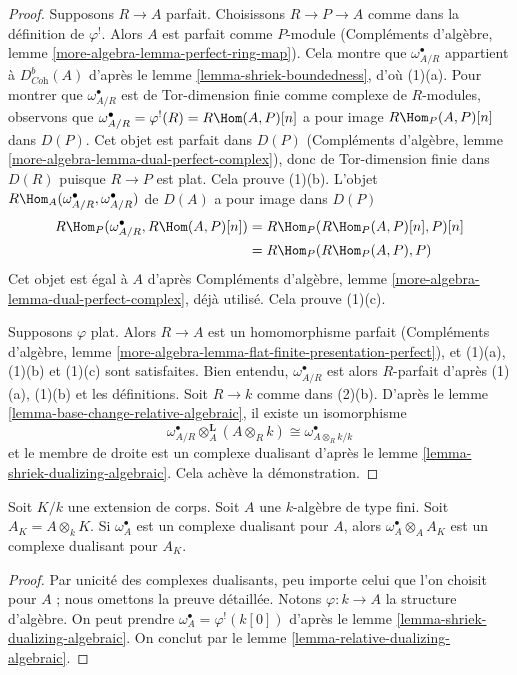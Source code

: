 \begin{proof}
Supposons $R \to A$ parfait. Choisissons $R \to P \to A$ comme dans la définition de $\varphi^!$.
Alors $A$ est parfait comme $P$-module
(Compléments d'algèbre, lemme \ref{more-algebra-lemma-perfect-ring-map}).
Cela montre que $\omega_{A/R}^\bullet$ appartient à $D^b_{\textit{Coh}}(A)$ d'après le lemme \ref{lemma-shriek-boundedness}, d'où (1)(a).
Pour montrer que $\omega_{A/R}^\bullet$ est de Tor-dimension finie comme complexe de $R$-modules,
observons que $\omega_{A/R}^\bullet = \varphi^!(R) = R\Hom(A, P)[n]$ a pour image $R\Hom_P(A, P)[n]$ dans $D(P)$.
Cet objet est parfait dans $D(P)$ (Compléments d'algèbre, lemme \ref{more-algebra-lemma-dual-perfect-complex}),
donc de Tor-dimension finie dans $D(R)$ puisque $R \to P$ est plat.
Cela prouve (1)(b). L'objet $R\Hom_A(\omega_{A/R}^\bullet, \omega_{A/R}^\bullet)$ de $D(A)$ a pour image dans $D(P)$
\begin{align*}
R\Hom_P(\omega_{A/R}^\bullet, R\Hom(A, P)[n])
& =
R\Hom_P(R\Hom_P(A, P)[n], P)[n] \\
& =
R\Hom_P(R\Hom_P(A, P), P)
\end{align*}
Cet objet est égal à $A$ d'après Compléments d'algèbre, lemme \ref{more-algebra-lemma-dual-perfect-complex},
déjà utilisé. Cela prouve (1)(c).

\medskip\noindent
Supposons $\varphi$ plat. Alors $R \to A$ est un homomorphisme parfait
(Compléments d'algèbre, lemme \ref{more-algebra-lemma-flat-finite-presentation-perfect}),
et (1)(a), (1)(b) et (1)(c) sont satisfaites.
Bien entendu, $\omega_{A/R}^\bullet$ est alors $R$-parfait d'après (1)(a), (1)(b) et les définitions.
Soit $R \to k$ comme dans (2)(b).
D'après le lemme \ref{lemma-base-change-relative-algebraic}, il existe un isomorphisme
$$
\omega_{A/R}^\bullet \otimes_A^\mathbf{L} (A \otimes_R k) \cong
\omega^\bullet_{A \otimes_R k/k}
$$
et le membre de droite est un complexe dualisant d'après le lemme \ref{lemma-shriek-dualizing-algebraic}.
Cela achève la démonstration.
\end{proof}

\begin{lemma}
\label{lemma-base-change-dualizing-over-field}
Soit $K/k$ une extension de corps. Soit $A$ une $k$-algèbre de type fini.
Soit $A_K = A \otimes_k K$. Si $\omega_A^\bullet$ est un complexe dualisant pour $A$,
alors $\omega_A^\bullet \otimes_A A_K$ est un complexe dualisant pour $A_K$.
\end{lemma}

\begin{proof}
Par unicité des complexes dualisants, peu importe celui que l'on choisit
pour $A$ ; nous omettons la preuve détaillée.
Notons $\varphi : k \to A$ la structure d'algèbre.
On peut prendre $\omega_A^\bullet = \varphi^!(k[0])$ d'après le lemme \ref{lemma-shriek-dualizing-algebraic}.
On conclut par le lemme \ref{lemma-relative-dualizing-algebraic}.
\end{proof}

